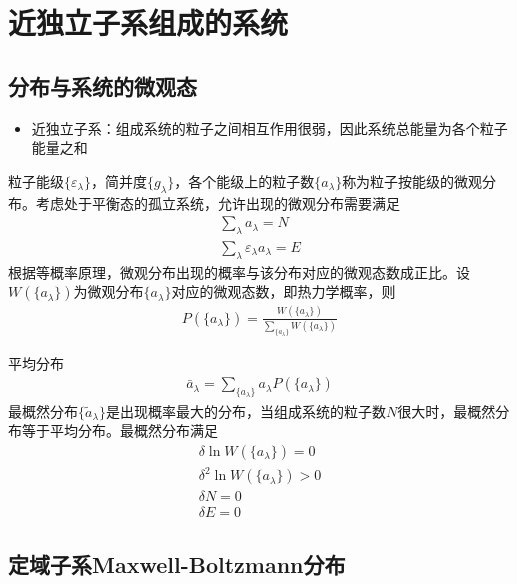\chapter{近独立子系组成的系统}

\section{分布与系统的微观态}

\begin{itemize}
    \item 近独立子系：组成系统的粒子之间相互作用很弱，因此系统总能量为各个粒子能量之和
\end{itemize}

粒子能级$\{\varepsilon_{\lambda}\}$，简并度$\{g_{\lambda}\}$，各个能级上的粒子数$\{a_{\lambda}\}$称为粒子按能级的微观分布。考虑处于平衡态的孤立系统，允许出现的微观分布需要满足
\begin{gather*}
    \sum_{\lambda} a_{\lambda} = N
    \\
    \sum_{\lambda} \varepsilon_{\lambda} a_{\lambda} = E
\end{gather*}
根据等概率原理，微观分布出现的概率与该分布对应的微观态数成正比。设$W(\{a_{\lambda}\})$为微观分布$\{a_{\lambda}\}$对应的微观态数，即热力学概率，则
\begin{gather*}
    P(\{a_{\lambda}\}) = \frac{W(\{a_{\lambda}\})}{\displaystyle \sum_{\{a_{\lambda}\}} W(\{a_{\lambda}\})}
\end{gather*}

平均分布
\begin{gather*}
    \bar{a}_{\lambda} = \sum_{\{a_{\lambda}\}} a_{\lambda} P(\{a_{\lambda}\})
\end{gather*}
最概然分布$\{\tilde{a}_{\lambda}\}$是出现概率最大的分布，当组成系统的粒子数$N$很大时，最概然分布等于平均分布。最概然分布满足
\begin{gather*}
    \delta \ln W(\{a_{\lambda}\}) = 0
    \\
    \delta^2 \ln W(\{a_{\lambda}\}) > 0
    \\
    \delta N = 0
    \\
    \delta E = 0
\end{gather*}

\section{定域子系\quad Maxwell-Boltzmann分布}

